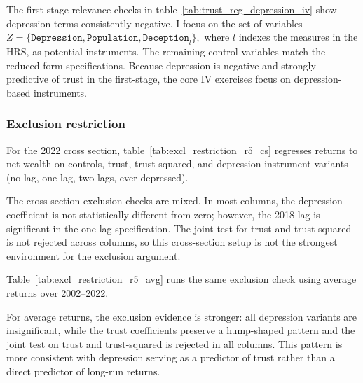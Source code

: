 \par The first-stage relevance checks in table~\ref{tab:trust_reg_depression_iv} show depression terms consistently negative. I focus on the set of variables $Z = \{\texttt{Depression}, \texttt{Population}, \texttt{Deception}_l\},$ where $l$ indexes the  measures in the HRS, as potential instruments. The remaining control variables match the reduced-form specifications. Because depression is negative and strongly predictive of trust in the first-stage, the core IV exercises focus on depression-based instruments.


\subsubsection{Exclusion restriction}

\par For the 2022 cross section, table~\ref{tab:excl_restriction_r5_cs} regresses returns to net wealth on controls, trust, trust-squared, and depression instrument variants (no lag, one lag, two lags, ever depressed).

\label{tab:excl_restriction_r5_cs}
\FloatBarrier

\par The cross-section exclusion checks are mixed. In most columns, the depression coefficient is not statistically different from zero; however, the 2018 lag is significant in the one-lag specification. The joint test for trust and trust-squared is not rejected across columns, so this cross-section setup is not the strongest environment for the exclusion argument.

\par Table~\ref{tab:excl_restriction_r5_avg} runs the same exclusion check using average returns over 2002--2022.

\label{tab:excl_restriction_r5_avg}
\FloatBarrier

\par For average returns, the exclusion evidence is stronger: all depression variants are insignificant, while the trust coefficients preserve a hump-shaped pattern and the joint test on trust and trust-squared is rejected in all columns. This pattern is more consistent with depression serving as a predictor of trust rather than a direct predictor of long-run returns.

